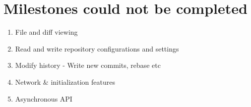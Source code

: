 \section{Milestones could not be completed}
\begin{enumerate}
	\item File and diff viewing
    \item Read and write repository configurations and settings
    \item Modify history - Write new commits, rebase etc
    \item Network \& initialization features
    \item Asynchronous API
\end{enumerate}

